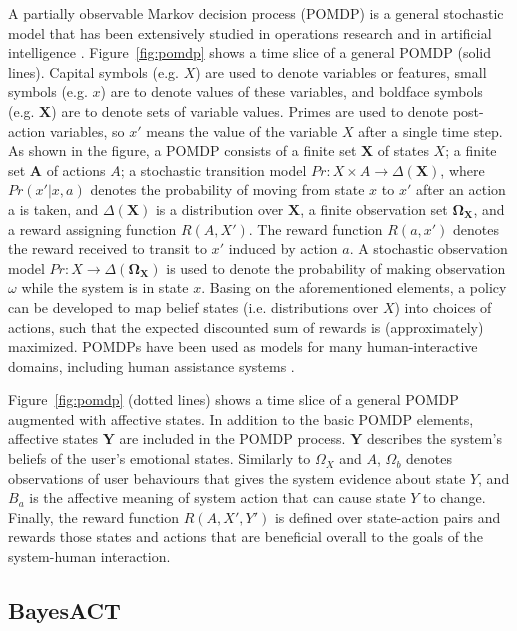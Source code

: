 A partially observable Markov decision process (POMDP) is a general stochastic model that has been extensively studied in operations research and in artificial intelligence \cite{monahan1982state, poupart2011introduction}. Figure~\ref{fig:pomdp} shows a time slice of a general POMDP (solid lines). Capital symbols (e.g. $X$) are used to denote variables or features, small symbols (e.g. $x$) are to denote values of these variables, and boldface symbols (e.g. $\mathbf{X}$) are to denote sets of variable values. Primes are used to denote post-action variables, so $x'$ means the value of the variable $X$ after a single time step. As shown in the figure, a POMDP consists of a finite set $\mathbf{X}$ of states $X$; a finite set $\mathbf{A}$ of actions $A$; a stochastic transition model $Pr : X \times A \to \Delta(\mathbf{X})$, where $Pr(x'|x, a)$ denotes the probability of moving from state $x$ to $x'$ after an action a is taken, and $\Delta(\mathbf{X})$ is a distribution over $\mathbf{X}$, a finite observation set $\mathbf{\Omega_{X}}$, and a reward assigning function $R(A, X')$. The reward function $R(a, x')$ denotes the reward received to transit to $x'$ induced by action $a$. A stochastic observation model $Pr : X \to \Delta(\mathbf{\Omega_{X}})$ is used to denote the probability of making observation $\omega$ while the system is in state $x$. Basing on the aforementioned elements, a policy can be developed to map belief states (i.e. distributions over $X$) into choices of actions, such that the expected discounted sum of rewards is (approximately) maximized. POMDPs have been used as models for many human-interactive domains, including human assistance systems \cite{hoey2010automated}.

Figure~\ref{fig:pomdp} (dotted lines) shows a time slice of a general POMDP augmented with affective states. In addition to the basic POMDP elements, affective states $\mathbf{Y}$ are included in the POMDP process. $\mathbf{Y}$ describes the system's beliefs of the user's emotional states. Similarly to $\Omega_{X}$ and $A$, $\Omega_{b}$ denotes observations of user behaviours that gives the system evidence about state $Y$, and $B_{a}$ is the affective meaning of system action that can cause state $Y$ to change. Finally, the reward function $R(A, X', Y')$ is defined over state-action pairs and rewards those states and actions that are beneficial overall to the goals of the system-human interaction. 

\subsection{BayesACT}

